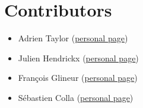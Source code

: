 \documentclass[11pt,a4paper]{article}
\begin{document}
	\section*{Contributors}
	\begin{itemize}
		\item Adrien Taylor (\href{http://www.di.ens.fr/~ataylor/}{personal page})
		\item Julien Hendrickx (\href{https://perso.uclouvain.be/julien.hendrickx/index.html}{personal page})
		\item Fran\c{c}ois Glineur (\href{https://perso.uclouvain.be/francois.glineur/}{personal page})
		\item S\'ebastien Colla (\href{https://perso.uclouvain.be/sebastien.colla/}{personal page})
	\end{itemize}

	\clearpage
\end{document}
